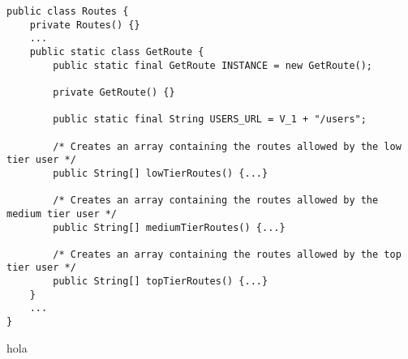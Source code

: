 \begin{codeBlock}
	\begin{verbatim}
public class Routes {
	private Routes() {}
	...
	public static class GetRoute {
		public static final GetRoute INSTANCE = new GetRoute();

		private GetRoute() {}

		public static final String USERS_URL = V_1 + "/users";

		/* Creates an array containing the routes allowed by the low tier user */
		public String[] lowTierRoutes() {...}

		/* Creates an array containing the routes allowed by the medium tier user */
		public String[] mediumTierRoutes() {...}

		/* Creates an array containing the routes allowed by the top tier user */
		public String[] topTierRoutes() {...}
	}
	...
}
	\end{verbatim}

	\caption{hola}
\end{codeBlock}

\lipsum
